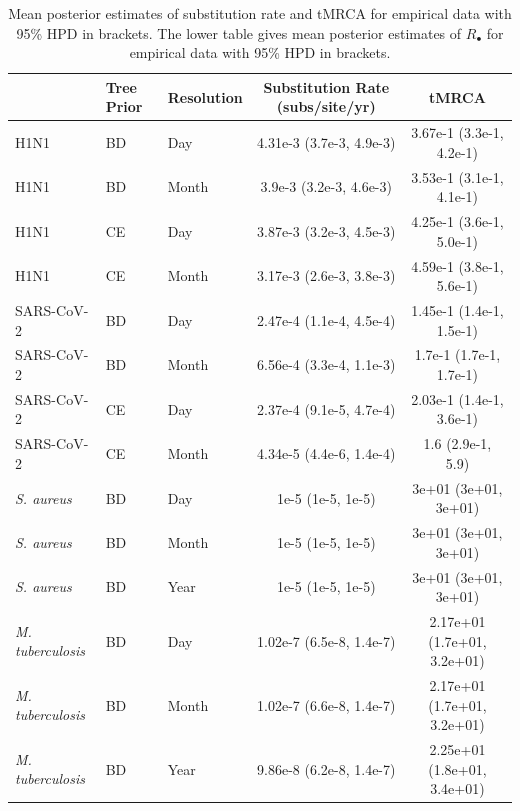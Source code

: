 \documentclass[12pt]{article}
\begin{document}
\begin{table}[H]
    \centering
    \small
    \caption{Mean posterior estimates of substitution rate and tMRCA for empirical data with 95\% HPD in brackets.  The lower table gives mean posterior estimates of $R_{\bullet}$ for empirical data with 95\% HPD in brackets.}
    \begin{tabular}{lllcc}
        \toprule
         & Tree Prior & Resolution & Substitution Rate (subs/site/yr) & tMRCA\\
        \midrule
        H1N1 & BD & Day & 4.31e-3 (3.7e-3, 4.9e-3) & 3.67e-1 (3.3e-1, 4.2e-1)\\
        H1N1 & BD & Month & 3.9e-3 (3.2e-3, 4.6e-3) & 3.53e-1 (3.1e-1, 4.1e-1)\\
        H1N1 & CE & Day & 3.87e-3 (3.2e-3, 4.5e-3) & 4.25e-1 (3.6e-1, 5.0e-1)\\
        H1N1 & CE & Month & 3.17e-3 (2.6e-3, 3.8e-3) & 4.59e-1 (3.8e-1, 5.6e-1)\\
        \midrule
        SARS-CoV-2 & BD & Day & 2.47e-4 (1.1e-4, 4.5e-4) & 1.45e-1 (1.4e-1, 1.5e-1)\\
        SARS-CoV-2 & BD & Month & 6.56e-4 (3.3e-4, 1.1e-3) & 1.7e-1 (1.7e-1, 1.7e-1)\\
        SARS-CoV-2 & CE & Day & 2.37e-4 (9.1e-5, 4.7e-4) & 2.03e-1 (1.4e-1, 3.6e-1)\\
        SARS-CoV-2 & CE & Month & 4.34e-5 (4.4e-6, 1.4e-4) & 1.6 (2.9e-1, 5.9)\\
        \midrule
        \textit{S. aureus} & BD & Day & 1e-5 (1e-5, 1e-5) & 3e+01 (3e+01, 3e+01)\\
        \textit{S. aureus} & BD & Month & 1e-5 (1e-5, 1e-5) & 3e+01 (3e+01, 3e+01)\\
        \textit{S. aureus} & BD & Year & 1e-5 (1e-5, 1e-5) & 3e+01 (3e+01, 3e+01)\\
        \midrule
        \textit{M. tuberculosis} & BD & Day & 1.02e-7 (6.5e-8, 1.4e-7) & 2.17e+01 (1.7e+01, 3.2e+01)\\
        \textit{M. tuberculosis} & BD & Month & 1.02e-7 (6.6e-8, 1.4e-7) & 2.17e+01 (1.7e+01, 3.2e+01)\\
        \textit{M. tuberculosis} & BD & Year & 9.86e-8 (6.2e-8, 1.4e-7) & 2.25e+01 (1.8e+01, 3.4e+01)\\
\bottomrule
    \end{tabular}

    \label{tab:emp-ests}
\end{table}
\end{document}

